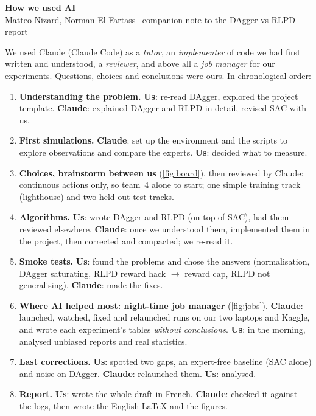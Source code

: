 \documentclass[10pt,a4paper]{article}
\newcommand{\us}{\textbf{Us}}
\newcommand{\cl}{\textbf{Claude}}
\begin{document}
\begin{center}
  {\Large\bfseries How we used AI}\\[2pt]
  Matteo Nizard, Norman El Fartass \quad--\quad companion note to the DAgger vs RLPD report
\end{center}

We used Claude (Claude Code) as a \emph{tutor}, an \emph{implementer} of code we had first written and understood,
a \emph{reviewer}, and above all a \emph{job manager} for our experiments. Questions, choices and conclusions were
ours. In chronological order:

\begin{enumerate}
  \item \textbf{Understanding the problem.} \us: re-read DAgger, explored the project template.
        \cl: explained DAgger and RLPD in detail, revised SAC with us.
  \item \textbf{First simulations.} \cl: set up the environment and the scripts to explore observations and
        compare the experts. \us: decided what to measure.
  \item \textbf{Choices, brainstorm between us} (\cref{fig:board}), then reviewed by Claude: continuous actions only,
        so team~4 alone to start; one simple training track (lighthouse) and two held-out test tracks.
  \item \textbf{Algorithms.} \us: wrote DAgger and RLPD (on top of SAC), had them reviewed elsewhere.
        \cl: once we understood them, implemented them in the project, then corrected and compacted; we re-read it.
  \item \textbf{Smoke tests.} \us: found the problems and chose the answers (normalisation, DAgger saturating,
        RLPD reward hack $\to$ reward cap, RLPD not generalising). \cl: made the fixes.
  \item \textbf{Where AI helped most: night-time job manager} (\cref{fig:jobs}). \cl: launched, watched, fixed and
        relaunched runs on our two laptops and Kaggle, and wrote each experiment's tables \emph{without conclusions}.
        \us: in the morning, analysed unbiased reports and real statistics.
  \item \textbf{Last corrections.} \us: spotted two gaps, an expert-free baseline (SAC alone) and noise on DAgger.
        \cl: relaunched them. \us: analysed.
  \item \textbf{Report.} \us: wrote the whole draft in French. \cl: checked it against the logs, then wrote the
        English \LaTeX{} and the figures.
\end{enumerate}
\end{document}
